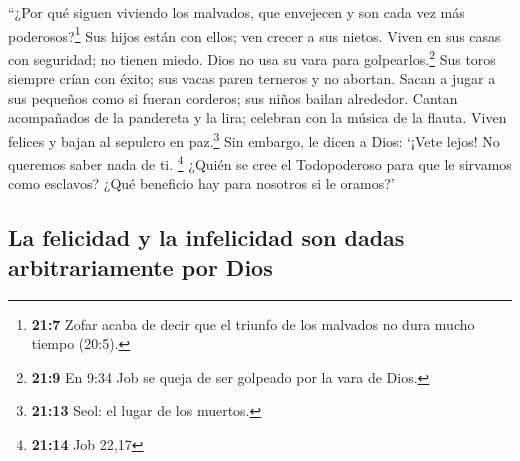  ``¿Por qué siguen viviendo los malvados, que envejecen y
son cada vez más poderosos?\footnote{\textbf{21:7} Zofar acaba de decir
  que el triunfo de los malvados no dura mucho tiempo (20:5).}
 Sus hijos están con ellos; ven crecer a sus nietos.
 Viven en sus casas con seguridad; no tienen miedo. Dios
no usa su vara para golpearlos.\footnote{\textbf{21:9} En 9:34 Job se
  queja de ser golpeado por la vara de Dios.}  Sus toros
siempre crían con éxito; sus vacas paren terneros y no abortan.
 Sacan a jugar a sus pequeños como si fueran corderos;
sus niños bailan alrededor.  Cantan acompañados de la
pandereta y la lira; celebran con la música de la flauta.
 Viven felices y bajan al sepulcro en paz.\footnote{\textbf{21:13}
  Seol: el lugar de los muertos.}  Sin embargo, le dicen
a Dios: `¡Vete lejos! No queremos saber nada de ti. \footnote{\textbf{21:14}
  Job 22,17}  ¿Quién se cree el Todopoderoso para que le
sirvamos como esclavos? ¿Qué beneficio hay para nosotros si le oramos?'

\hypertarget{la-felicidad-y-la-infelicidad-son-dadas-arbitrariamente-por-dios}{%
\subsection{La felicidad y la infelicidad son dadas arbitrariamente por
Dios}\label{la-felicidad-y-la-infelicidad-son-dadas-arbitrariamente-por-dios}}

